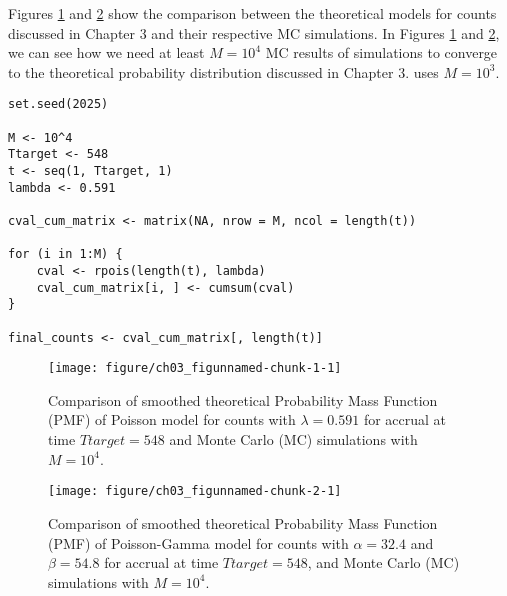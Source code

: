 Figures \ref{fig:3_1} and \ref{fig:3_2} show the comparison between the theoretical models for counts discussed in Chapter 3 and their respective MC simulations. In Figures \ref{fig:3_1} and \ref{fig:3_2}, we can see how we need at least $M=10^4$ MC results of simulations to converge to the theoretical probability distribution discussed in Chapter 3. \cite{carter2004application} uses $M = 10^3$.


\begin{knitrout}
\color{fgcolor}\begin{kframe}
\begin{verbatim}
set.seed(2025)

M <- 10^4
Ttarget <- 548
t <- seq(1, Ttarget, 1)
lambda <- 0.591

cval_cum_matrix <- matrix(NA, nrow = M, ncol = length(t))

for (i in 1:M) {
	cval <- rpois(length(t), lambda)
	cval_cum_matrix[i, ] <- cumsum(cval)
}

final_counts <- cval_cum_matrix[, length(t)]
\end{verbatim}
\end{kframe}
\end{knitrout}


\begin{figure}
\begin{knitrout}
\color{fgcolor}
\texttt{[image: figure/ch03\_figunnamed-chunk-1-1]} 
\end{knitrout}
  \caption{Comparison of smoothed theoretical Probability Mass Function (PMF) of Poisson model for counts with $\lambda = 0.591$ for accrual at time $Ttarget=548$ and Monte Carlo (MC) simulations with $M=10^4$.}
  \label{fig:3_1}
\end{figure}



\begin{figure}
\begin{knitrout}
\color{fgcolor}
\texttt{[image: figure/ch03\_figunnamed-chunk-2-1]} 
\end{knitrout}
\caption{Comparison of smoothed theoretical Probability Mass Function (PMF) of Poisson-Gamma model for counts with $\alpha = 32.4$ and $\beta = 54.8$ for accrual at time $Ttarget=548$, and Monte Carlo (MC) simulations with $M=10^4$.}
\label{fig:3_2}
\end{figure}

